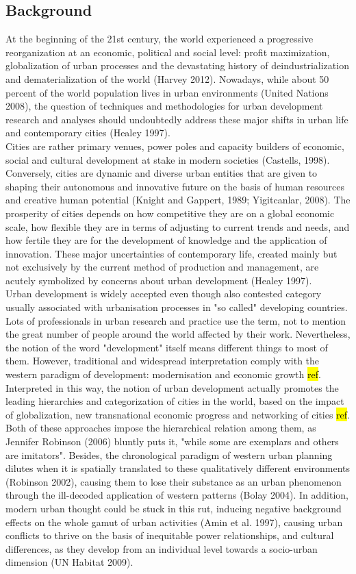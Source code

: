 \documentclass[11pt]{report}
\begin{document}
\subsection{Background}
At the beginning of the 21st century, the world experienced a progressive reorganization at an economic, political and social level: profit maximization, globalization of urban processes and the devastating history of deindustrialization and dematerialization of the world (Harvey 2012). Nowadays, while about 50 percent of the world population lives in urban environments (United Nations 2008), the question of techniques and methodologies for urban development research and analyses should undoubtedly address these major shifts in urban life and contemporary cities (Healey 1997).
\\
Cities are rather primary venues, power poles and capacity builders of economic, social and cultural development at stake in modern societies (Castells, 1998). Conversely, cities are dynamic and diverse urban entities that are given to shaping their autonomous and innovative future on the basis of human resources and creative human potential (Knight and Gappert, 1989; Yigitcanlar, 2008). The prosperity of cities depends on how competitive they are on a global economic scale, how flexible they are in terms of adjusting to current trends and needs, and how fertile they are for the development of knowledge and the application of innovation. These major uncertainties of contemporary life, created mainly but not exclusively by the current method of production and management, are acutely symbolized by concerns about urban development (Healey 1997).
\\
Urban development is widely accepted even though also contested category usually associated with urbanisation processes in "so called" developing countries. Lots of professionals in urban research and practice use the term, not to mention the great number of people around the world affected by their work. Nevertheless, the notion of the word "development" itself means different things to most of them.
However, traditional and widespread interpretation comply with the western paradigm of development: modernisation and economic growth \hl{ref}. Interpreted in this way, the notion of urban development actually promotes the leading hierarchies and categorization of cities in the world, based on the impact of globalization, new transnational  economic  progress  and  networking  of  cities \hl{ref}. Both of these approaches impose the hierarchical relation among them, as Jennifer Robinson (2006) bluntly puts it, "while some are exemplars and others are imitators". Besides, the chronological paradigm of western urban planning dilutes when it is spatially translated to these qualitatively different environments (Robinson 2002), causing them to lose their substance as an urban phenomenon through the ill-decoded application of western patterns (Bolay 2004). In addition, modern urban thought could be stuck in this rut, inducing negative background effects on the whole gamut of urban activities (Amin et al. 1997), causing urban conflicts to thrive on the basis of inequitable power relationships, and cultural differences, as they develop from an individual level towards a socio-urban dimension (UN Habitat 2009).
\end{document}
